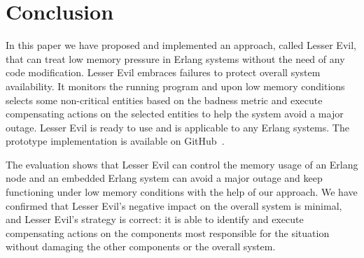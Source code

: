 \documentclass{llncs}
\begin{document}
\section{Conclusion}
In this paper we have proposed and implemented an approach, called Lesser Evil, that can treat low memory pressure in Erlang systems without the need of any code modification. Lesser Evil embraces failures to protect overall system availability. It monitors the running program and upon low memory conditions selects some non-critical entities based on the badness metric and execute compensating actions on the selected entities to help the system avoid a major outage. Lesser Evil is ready to use and is applicable to any Erlang systems. The prototype implementation is available on GitHub~\cite{lesser-evil}.

The evaluation shows that Lesser Evil can control the memory usage of an Erlang node and an embedded Erlang system can avoid a major outage and keep functioning under low memory conditions with the help of our approach. We have confirmed that Lesser Evil's negative impact on the overall system is minimal, and Lesser Evil's strategy is correct: it is able to identify and execute compensating actions on the components most responsible for the situation without damaging the other components or the overall system.


%
%
%
 
 
 
\end{document}
